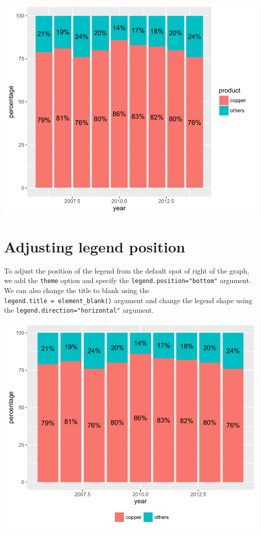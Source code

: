 \begin{center}\includegraphics[width=0.6\linewidth]{4_Stacked_Bar_pdf/stacked_3-1} \end{center}

\section{Adjusting legend position}\label{adjusting-legend-position}

To adjust the position of the legend from the default spot of right of
the graph, we add the \texttt{theme} option and specify the
\texttt{legend.position="bottom"} argument. We can also change the title
to blank using the \texttt{legend.title\ =\ element\_blank()} argument
and change the legend shape using the\newline
\texttt{legend.direction="horizontal"} argument.

\begin{Shaded}
\begin{Highlighting}[]
\StringTok{ }\StringTok{ }\NormalTok{(}\NormalTok{, }\NormalTok{, }
   \NormalTok{())}
\end{Highlighting}
\end{Shaded}

\begin{center}\includegraphics[width=0.6\linewidth]{4_Stacked_Bar_pdf/stacked_4-1} \end{center}


